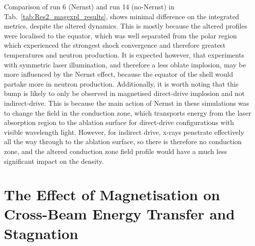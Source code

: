 Comparison of run 6 (Nernst) and run 14 (no-Nernst) in Tab.~\ref{tab:Res2_magexpl_results}, shows minimal difference on the integrated metrics, despite the altered dynamics.
This is mostly because the altered profiles were localised to the equator, which was well separated from the polar region which experienced the strongest shock convergence and therefore greatest temperatures and neutron production.
It is expected however, that experiments with symmetric laser illumination, and therefore a less oblate implosion, may be more influenced by the Nernst effect, because the equator of the shell would partake more in neutron production.
Additionally, it is worth noting that this bump is likely to only be observed in magnetised direct-drive implosion and not indirect-drive.
This is because the main action of Nernst in these simulations was to change the field in the conduction zone, which transports energy from the laser absorption region to the ablation surface for direct-drive configurations with visible wavelength light.
However, for indirect drive, x-rays penetrate effectively all the way through to the ablation surface, so there is therefore no conduction zone, and the altered conduction zone field profile would have a much less significant impact on the density.

\section{The Effect of Magnetisation on Cross-Beam Energy Transfer and Stagnation}%
\label{sec:Res2_mag_on_CBET}

